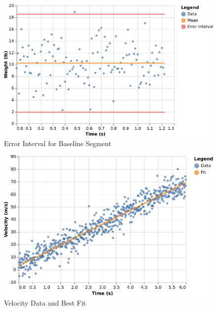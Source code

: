 %
\begin{figure}[ht]
    \centering
    \includegraphics{chart/00-intro/baseline-error-interval.pdf}
    \caption{Error Interval for Baseline Segment}
    \label{figure:00.baseline.interval}
\end{figure}
%
\begin{figure}[ht]
    \centering
    \includegraphics{chart/00-intro/velocity-fit.pdf}
    \caption{Velocity Data and Best Fit}
    \label{figure:00.velocity.fit}
\end{figure}
%
